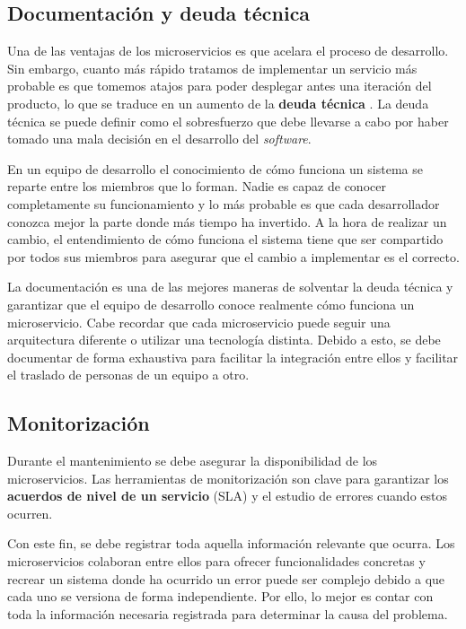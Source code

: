 \documentclass[11pt,spanish,listoffigures]{tfgetsinf}
\begin{document}
\subsection{Documentación y deuda técnica}

Una de las ventajas de los microservicios es que acelara el proceso de desarrollo. Sin embargo, cuanto más rápido tratamos de implementar un servicio más probable es que tomemos atajos para poder desplegar antes una iteración del producto, lo que se traduce en un aumento de la \textbf{deuda técnica} \cite{FowlerSusan, Garzas}. La deuda técnica se puede definir como el sobresfuerzo que debe llevarse a cabo por  haber tomado una mala decisión en el desarrollo del \textit{software}.

En un equipo de desarrollo el conocimiento de cómo funciona un sistema se reparte entre los miembros que lo forman. Nadie es capaz de conocer completamente su funcionamiento y lo más probable es que cada desarrollador conozca mejor la parte donde más tiempo ha invertido. A la hora de realizar un cambio, el entendimiento de cómo funciona el sistema tiene que ser compartido por todos sus miembros para asegurar que el cambio a implementar es el correcto.

La documentación es una de las mejores maneras de solventar la deuda técnica y garantizar que el equipo de desarrollo conoce realmente cómo funciona un microservicio. Cabe recordar que cada microservicio puede seguir una arquitectura diferente o utilizar una tecnología distinta. Debido a esto, se debe documentar de forma exhaustiva para facilitar la integración entre ellos y facilitar el traslado de personas de un equipo a otro.

\subsection{Monitorización}

Durante el mantenimiento se debe asegurar la disponibilidad de los microservicios. Las herramientas de monitorización son clave para garantizar los \textbf{acuerdos de nivel de un servicio} (SLA) y el estudio de errores cuando estos ocurren.

Con este fin, se debe registrar toda aquella información relevante que ocurra. Los microservicios colaboran entre ellos para ofrecer funcionalidades concretas y recrear un sistema donde ha ocurrido un error puede ser complejo debido a que cada uno se versiona de forma independiente. Por ello, lo mejor es contar con toda la información necesaria registrada para determinar la causa del problema.
\end{document}

